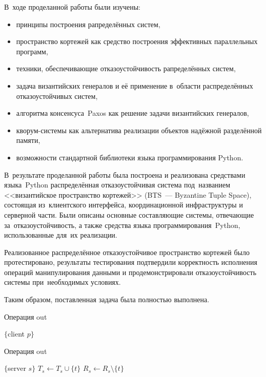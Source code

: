 \Conc
В~ходе проделанной работы были изучены:
\begin{itemize}
	\item принципы построения рапределённых систем,
	\item пространство кортежей как средство построения эффективных параллельных программ,
	\item техники, обеспечивающие отказоустойчивость рапределённых систем,
	\item задача византийских генералов и её применение в~области распределённых отказоустойчивых систем,
	\item алгоритма консенсуса~Paxos как решение задачи византийских генералов,
	\item кворум-системы как альтернатива реализации объектов надёжной разделённой памяти,
	\item возможности стандартной библиотеки языка программирования Python.
\end{itemize}

В~результате проделанной работы была построена и реализована средствами языка~Python распределённая отказоустойчивая система под~названием <<византийское пространство кортежей>> (BTS~--- Byzantine Tuple Space), состоящая из~клиентского интерфейса, координационной инфраструктуры и серверной части. Были описаны основные составляющие системы, отвечающие за~отказоустойчивость, а также средства языка программирования~Python, использованные для~их реализации.

Реализованное распределённое отказоустойчивое пространство кортежей было протестировано, результаты тестирования подтвердили корректность исполнения операций манипулирования данными и продемонстрировали отказоустойчивость системы при~необходимых условиях.

Таким образом, поставленная задача была полностью выполнена.


\printbibliography[heading=bibintoc]



\begin{algorithm}[H]
	\caption{Операция out}\label{alg1}
	\begin{algorithmic}[1]
		\Statex $\{$client $p \}$
		\State {}
		\EndFor
		\EndProcedure
	\end{algorithmic}
\end{algorithm}
\begin{algorithm}[H]
	\caption{Операция out}\label{alg2}
	\begin{algorithmic}[1]
		\Statex $\{$server $s \}$
		\State $T_s \gets T_s \cup \{t\}$
		\EndIf
		\State $R_s \gets R_s \setminus \{t\}$
		\EndUpon
	\end{algorithmic}
\end{algorithm}

